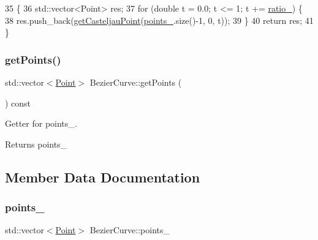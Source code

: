 \begin{DoxyCode}
35                                              \{
36     std::vector<Point> res;
37     \textcolor{keywordflow}{for} (\textcolor{keywordtype}{double} t = 0.0; t <= 1; t += \mbox{\hyperlink{class_bezier_curve_a9a6d08efdae6b77334cb731f6c593142}{ratio\_}}) \{
38         res.push\_back(\mbox{\hyperlink{class_bezier_curve_a7e0c40cb373da6aa1aa1acd5fce9d503}{getCasteljauPoint}}(\mbox{\hyperlink{class_bezier_curve_a73c8f89d9002be75295e6a0546547189}{points\_}}.size()-1, 0, t));
39     \}
40     \textcolor{keywordflow}{return} res;
41 \}
\end{DoxyCode}
\mbox{\label{class_bezier_curve_a0ebb942d8285628bead89d154f39e616}} 
\subsubsection{\texorpdfstring{get\+Points()}{getPoints()}}
{\footnotesize\ttfamily std\+::vector$<$\mbox{\hyperlink{class_point}{Point}}$>$ Bezier\+Curve\+::get\+Points (\begin{DoxyParamCaption}{ }\end{DoxyParamCaption}) const}



Getter for points\+\_\+. 

\begin{DoxyReturn}{Returns}
points\+\_\+ 
\end{DoxyReturn}


\subsection{Member Data Documentation}
\mbox{\label{class_bezier_curve_a73c8f89d9002be75295e6a0546547189}} 
\subsubsection{\texorpdfstring{points\+\_\+}{points\_}}
{\footnotesize\ttfamily std\+::vector$<$\mbox{\hyperlink{class_point}{Point}}$>$ Bezier\+Curve\+::points\+\_\+\hspace{0.3cm}{\ttfamily [private]}}

